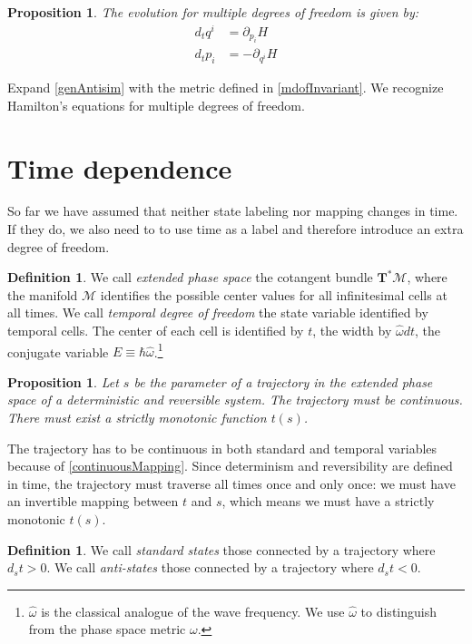 \documentclass[aps,pra,10pt,twocolumn,floatfix,nofootinbib]{revtex4-1}
\newtheorem{prop}[thm]{Proposition}
\theoremstyle{definition}
\newtheorem{defn}[thm]{Definition}
\begin{document}
\begin{prop}\label{mdofHam}
The evolution for multiple degrees of freedom is given by:
\begin{align*}
d_{t}q^i &= \partial_{p_i} H \\
d_{t}p_i &= - \partial_{q^i} H
\end{align*}
\end{prop}

Expand \ref{genAntisim} with the metric defined in \ref{mdofInvariant}. We recognize Hamilton's equations for multiple degrees of freedom\cite{classical_dynamics}.

\section{Time dependence}

So far we have assumed that neither state labeling nor mapping changes in time. If they do, we also need to to use time as a label and therefore introduce an extra degree of freedom.

\begin{defn}\label{tdof}
We call \emph{extended phase space} the cotangent bundle $\mathbf{T}^*\mathcal{M}$, where the manifold $\mathcal{M}$ identifies the possible center values for all infinitesimal cells at all times. We call \emph{temporal degree of freedom} the state variable identified by temporal cells. The center of each cell is identified by $t$, the width by $\hat{\omega} dt$, the conjugate variable $E\equiv\hbar\hat{\omega}$.\footnote{$\hat{\omega}$ is the classical analogue of the wave frequency. We use $\hat{\omega}$ to distinguish from the phase space metric $\omega$.}
\end{defn}

\begin{prop}\label{tdofMonotonic}
Let $s$ be the parameter of a trajectory in the extended phase space of a deterministic and reversible system. The trajectory must be continuous. There must exist a strictly monotonic function $t(s)$.
\end{prop}

The trajectory has to be continuous in both standard and temporal variables because of \ref{continuousMapping}. Since determinism and reversibility are defined in time, the trajectory must traverse all times once and only once: we must have an invertible mapping between $t$ and $s$, which means we must have a strictly monotonic $t(s)$.

\begin{defn}\label{tdofAntistates}
We call \emph{standard states} those connected by a trajectory where $d_{s}t>0$. We call \emph{anti-states} those connected by a trajectory where $d_{s}t<0$.
\end{defn}
\end{document}
